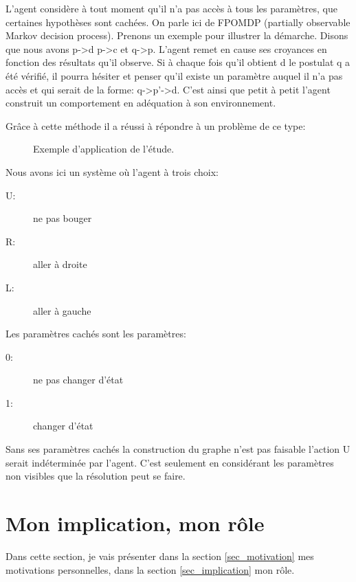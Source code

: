 \documentclass[french]{article}
\begin{document}
      L'agent considère à tout moment qu'il n'a pas accès à tous les paramètres, que certaines hypothèses sont cachées. On parle ici de FPOMDP (partially observable Markov decision process). Prenons un exemple pour illustrer la démarche. Disons que nous avons p->d p->c et q->p. L'agent remet en cause ses croyances en fonction des résultats qu'il observe. Si à chaque fois qu'il obtient d le postulat q a été vérifié, il pourra hésiter et penser qu'il existe un paramètre auquel il n'a pas accès et qui serait de la forme: q->p'->d. C'est ainsi que petit à petit l'agent construit un comportement en adéquation à son environnement.


      Grâce à cette méthode il a réussi à répondre à un problème de ce type:

		\begin{figure}[h]
      	\centering
   		\caption{Exemple d'application de l'étude.}
      	\end{figure}
      


       Nous avons ici un système où l'agent à trois choix:
       \begin{description}
          \item [{U:}] ne pas bouger
          \item [{R:}] aller à droite
          \item [{L:}] aller à gauche
       \end{description}
       Les paramètres cachés sont les paramètres: 
       \begin{description}
          \item [{0:}] ne pas changer d'état
          \item [{1:}] changer d'état
       \end{description}
       
       Sans ses paramètres cachés la construction du graphe n'est pas faisable l'action U serait indéterminée par l'agent. C'est seulement en considérant les paramètres non visibles que la résolution peut se faire. 


\section{Mon implication, mon rôle}


  Dans cette section, je vais présenter dans la section \ref{sec_motivation}  mes motivations personnelles, dans la section \ref{sec_implication} mon rôle. 
\end{document}
